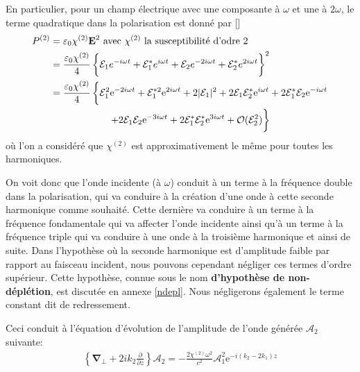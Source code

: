 \documentclass[11pt,a4paper] { article}
\newcommand{\ncite}[1]{[\citenum{#1}]}
\newcommand{\E}{\mathcal{E}}
\newcommand{\A}{\mathcal{A}}
\newcommand{\e}[1]{\text{e}^{#1}}
\renewcommand{\v}[1]{\boldsymbol{\mathbf{#1}}}
\begin{document}
En particulier, pour un champ électrique avec une composante à $\omega$ et une à $2\omega$, le terme quadratique dans la polarisation est donné par \ncite{joffre}
\begin{align*}
	P^{(2)} &= \varepsilon_0 \chi^{(2)} \v E^2  \text{ avec $\chi^{(2)}$ la susceptibilité d'odre 2}\\
	&= \frac{\varepsilon_0 \chi^{(2)}}{4} \left\{\mathcal E_1 e^{-i\omega t} + \mathcal E_1^* e^{i\omega t} + \mathcal E_2 e^{-2i\omega t} + \mathcal E_2^* e^{2i\omega t} \vphantom{\frac12}\right\}^2 \\
	&= \frac{\varepsilon_0 \chi^{(2)}}{4} \left\{\mathcal E_1^2 \e{-2i\omega t} + \E_1^{*2} \e{2i\omega t} + 2|\mathcal E_1|^2 + 2 \E_1\E_2^* \e{i\omega t} + 2 \E_1^*\E_2 \e{-i\omega t} \vphantom{\frac12}\right. \\
	&\qquad\qquad\qquad \left. + 2 \E_1\E_2 \e{-3 i\omega t}  + 2 \E_1^*\E_2^* \e{3 i\omega t} + \mathcal O(\E_2^2) \vphantom{\frac12}\right\} \\ 
\end{align*}
où l'on a considéré que $\chi^{(2)}$ est approximativement le même pour toutes les harmoniques. 

On voit donc que l'onde incidente (à $\omega$) conduit à un terme à la fréquence double dans la polarisation, qui va conduire à la création d'une onde à cette seconde harmonique comme souhaité. Cette dernière va conduire à un terme à la fréquence fondamentale qui va affecter l'onde incidente ainsi qu'à un terme à la fréquence triple qui va conduire à une onde à la troisième harmonique et ainsi de suite. 
Dans l'hypothèse où la seconde harmonique est d'amplitude faible par rapport au faisceau incident, nous pouvons cependant négliger ces termes d'ordre supérieur. Cette hypothèse, connue sous le nom \textbf{d'hypothèse de non-déplétion}, est discutée en annexe \ref{ndepl}. Nous négligerons également le terme constant dit de redressement. %



Ceci conduit à l'équation d'évolution de l'amplitude de l'onde générée $\A_2$ suivante:
\begin{align}
	\left\{\v\nabla_\bot + 2 i k_2 \frac{\partial}{\partial z} \right\} \A_2 = - \frac{2 \chi^{(2)} \omega^2}{c^2} \A_1^2 \e{- i (k_2 - 2k_1) z}
	\label{eq:SHG}
\end{align}
\end{document}
